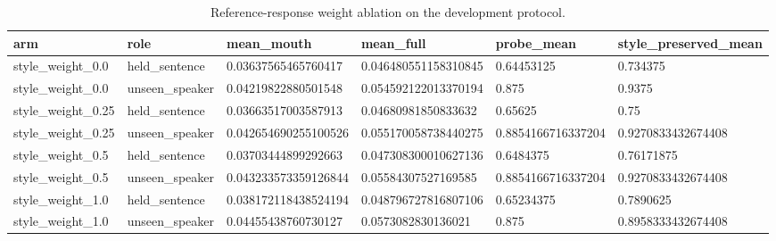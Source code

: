 \begin{table}[t]
\centering
\caption{Reference-response weight ablation on the development protocol.}
\begin{tabular}{llllll}
\toprule
arm & role & mean\_mouth & mean\_full & probe\_mean & style\_preserved\_mean \\
\midrule
style\_weight\_0.0 & held\_sentence & 0.03637565465760417 & 0.046480551158310845 & 0.64453125 & 0.734375 \\
style\_weight\_0.0 & unseen\_speaker & 0.04219822880501548 & 0.054592122013370194 & 0.875 & 0.9375 \\
style\_weight\_0.25 & held\_sentence & 0.03663517003587913 & 0.04680981850833632 & 0.65625 & 0.75 \\
style\_weight\_0.25 & unseen\_speaker & 0.042654690255100526 & 0.055170058738440275 & 0.8854166716337204 & 0.9270833432674408 \\
style\_weight\_0.5 & held\_sentence & 0.03703444899292663 & 0.047308300010627136 & 0.6484375 & 0.76171875 \\
style\_weight\_0.5 & unseen\_speaker & 0.043233573359126844 & 0.05584307527169585 & 0.8854166716337204 & 0.9270833432674408 \\
style\_weight\_1.0 & held\_sentence & 0.038172118438524194 & 0.048796727816807106 & 0.65234375 & 0.7890625 \\
style\_weight\_1.0 & unseen\_speaker & 0.04455438760730127 & 0.0573082830136021 & 0.875 & 0.8958333432674408 \\
\bottomrule
\end{tabular}
\end{table}
